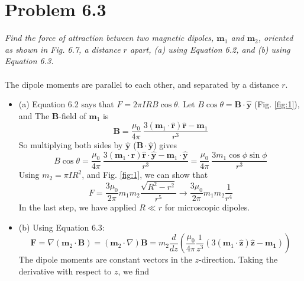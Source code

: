 \documentclass[10pt]{article}
\begin{document}
\maketitle

\section{Problem 6.3}

\textit{Find the force of attraction between two magnetic dipoles, $\mathbf{m}_1$ and $\mathbf{m}_2$, oriented as shown in Fig. 6.7, a distance $r$ apart, (a) using Equation 6.2, and (b) using Equation 6.3.} \\ \\
The dipole moments are parallel to each other, and separated by a distance $r$.
\begin{itemize}
\item (a) Equation 6.2 says that $F = 2\pi I R B\cos\theta$.  Let $B\cos\theta = \mathbf{B} \cdot \hat{\mathbf{y}}$ (Fig. \ref{fig:1}), and The $\mathbf{B}$-field of $\mathbf{m}_1$ is 
\begin{equation}
\mathbf{B} = \frac{\mu_0}{4\pi}~\frac{3(\mathbf{m}_1 \cdot \hat{\mathbf{r}})\hat{\mathbf{r}} - \mathbf{m}_1}{r^3}
\end{equation}
So multiplying both sides by $\hat{\mathbf{y}}$ ($\mathbf{B} \cdot \hat{\mathbf{y}}$) gives
\begin{equation}
B\cos\theta = \frac{\mu_0}{4\pi}~\frac{3(\mathbf{m}_1 \cdot \hat{\mathbf{r}})\hat{\mathbf{r}} \cdot \hat{\mathbf{y}} - \mathbf{m}_1 \cdot \hat{\mathbf{y}}}{r^3} = \frac{\mu_0}{4\pi}~\frac{3m_1\cos\phi\sin\phi}{r^3}
\end{equation}
Using $m_2 = \pi I R^2$, and Fig. \ref{fig:1}, we can show that
\begin{equation}
F = \frac{3\mu_0}{2\pi}m_1 m_2 \frac{\sqrt{R^2 - r^2}}{r^5} \to \frac{3\mu_0}{2\pi}m_1 m_2 \frac{1}{r^4}
\end{equation}
In the last step, we have applied $R \ll r$ for microscopic dipoles.
\item (b) Using Equation 6.3:
\begin{equation}
\mathbf{F} = \nabla (\mathbf{m}_2 \cdot \mathbf{B}) = (\mathbf{m}_2 \cdot \nabla) \mathbf{B} =  m_2 \frac{d}{dz}\left( \frac{\mu_0}{4\pi}\frac{1}{z^3} (3(\mathbf{m}_1 \cdot \hat{\mathbf{z}})\hat{\mathbf{z}} - \mathbf{m_1}) \right)
\end{equation}
The dipole moments are constant vectors in the $z$-direction.  Taking the derivative with respect to $z$, we find

\end{itemize}
\end{document}
